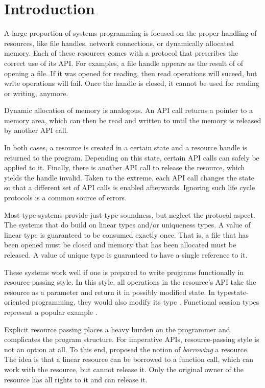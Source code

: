 \section{Introduction}

A large proportion of systems programming is focused on the proper
handling of resources, like file handles, network connections, or
dynamically allocated memory. Each of these resources comes with a
protocol that prescribes the correct use of its API.
For examples, a file handle appears as the result of of opening a
file. If it was opened for reading, then read operations will suceed,
but write operations will fail. Once the handle is closed, it cannot
be used for reading or writing, anymore.

Dynamic allocation of memory is analogous. An API call returns a
pointer to a memory area, which can then be read and written to until
the memory is released by another API call.

In both cases, a resource is created in a certain state and a resource
handle is returned to the program. Depending on this state, certain API calls
can safely be applied to it. Finally, there is another API call to
release the resource, which yields the handle invalid.
Taken to the extreme, each API call changes the state so that a
different set of API calls is enabled afterwards. 
Ignoring such life cycle protocols is a common source of errors.


Most type systems provide just type soundness, but neglect the
protocol aspect. The systems that do build on linear types \cite{Girard} and/or
uniqueness types\cite{DBLP:conf/plilp/BarendsenS95}. A value of linear
type is guaranteed to be consumed 
exactly once. That is, a file that has been opened must be closed and
memory that has been allocated must be released. A value of unique
type is guaranteed to have a single reference to it.

These systems work well if one is prepared to write programs
functionally in resource-passing style. In this style, all operations
in the resource's API take the resource as a parameter and return it
in possibly modified state\cite{DBLP:journals/jfp/AchtenP95}. In
typestate-oriented programming, they would also modify its type
\cite{DBLP:conf/oopsla/AldrichSSS09}. Functional session types
represent a popular example \cite{DBLP:journals/jfp/GayV10}.

Explicit resource passing places a heavy burden on the programmer and
complicates the program structure. For imperative APIs,
resource-passing style is not an option at all. To this end,
\citet{DBLP:conf/popl/BoylandR05}  proposed the notion of
\emph{borrowing} a resource. The idea is that a linear resource can be
borrowed to a function call, which can work with the resource, but
cannot release it. Only the original owner of the resource has all
rights to it and can release it.


